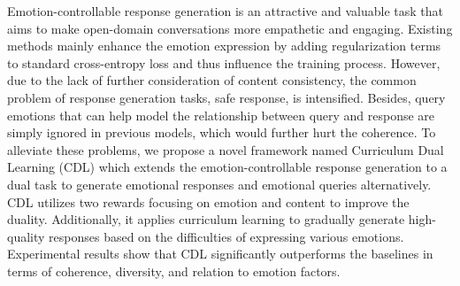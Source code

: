 Emotion-controllable response generation is an attractive and valuable task that aims to make open-domain conversations more empathetic and engaging. Existing methods mainly enhance the emotion expression by adding regularization terms to standard cross-entropy loss and thus influence the training process. However, due to the lack of further consideration of content consistency, the common problem of response generation tasks, safe response, is intensified. Besides, query emotions that can help model the relationship between query and response are simply ignored in previous models, which would further hurt the coherence. To alleviate these problems, we propose a novel framework named Curriculum Dual Learning (CDL) which extends the emotion-controllable response generation to a dual task to generate emotional responses and emotional queries alternatively. CDL utilizes two rewards focusing on emotion and content to improve the duality. Additionally, it applies curriculum learning to gradually generate high-quality responses based on the difficulties of expressing various emotions. Experimental results show that CDL significantly outperforms the baselines in terms of coherence, diversity, and relation to emotion factors.
